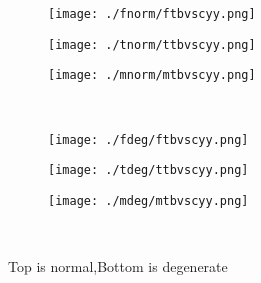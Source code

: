 \documentclass[aps,floats,floatfix,nofootinbib]{revtex4-1}
\begin{document}
\begin{center}
\begin{figure}
\begin{subfigure}{0.3\textwidth}
\texttt{[image: ./fnorm/ftbvscyy.png]}
\label{}
\end{subfigure}
\begin{subfigure}{0.3\textwidth}
\texttt{[image: ./tnorm/ttbvscyy.png]}
\label{}
\end{subfigure}
\begin{subfigure}{0.3\textwidth}
\texttt{[image: ./mnorm/mtbvscyy.png]}
\label{}
\end{subfigure}\\
\begin{subfigure}{0.3\textwidth}
\texttt{[image: ./fdeg/ftbvscyy.png]}
\label{}
\end{subfigure}
\begin{subfigure}{0.3\textwidth}
\texttt{[image: ./tdeg/ttbvscyy.png]}
\label{}
\end{subfigure}
\begin{subfigure}{0.3\textwidth}
\texttt{[image: ./mdeg/mtbvscyy.png]}
\label{}
\end{subfigure}\\
\caption{Top is normal,Bottom is degenerate}
\end{figure}
\end{center}
\end{document}
